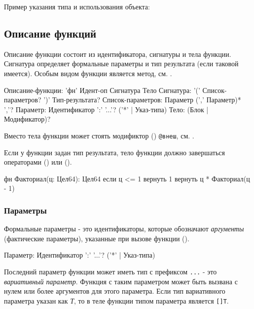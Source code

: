 \bigskip
Пример указания типа и использования объекта:


\hypertarget{functions}{%
\subsection{Описание функций}\label{decls:functions}}

Описание функции состоит из идентификатора, сигнатуры  и тела функции. 
Сигнатура определяет формальные параметры и тип результата (если таковой имеется). 
Особым видом функции является метод, см. .

\begin{Grammar}
Описание-функции: 'фн' Идент-оп Сигнатура Тело
Сигнатура: '(' Список-параметров? ')' Тип-результата?
Список-параметров: Параметр (',' Параметр)* ','?
Параметр: Идентификатор ':' '...'? ('*' | Указ-типа)  
Тело: (Блок | Модификатор)?
\end{Grammar} 

Вместо тела функции может стоять модификтор () \verb|@внеш|, см. .

Если у функции задан тип результата, тело функции должно завершаться операторами  () или  ().

\begin{Trivil}
фн Факториал(ц: Цел64): Цел64 {
    если ц <= 1 { вернуть 1 }
    вернуть ц * Факториал(ц - 1)
}
\end{Trivil}

\hypertarget{params}{%
\subsubsection{Параметры}\label{decls:params}}

Формальные параметры - это идентификаторы, которые обозначают \emph{аргументы} (фактические параметры), указанные при вызове функции ().

\begin{Grammar}
Параметр: Идентификатор ':' '...'? ('*' | Указ-типа)  
\end{Grammar} 

Последний параметр функции может иметь тип с префиксом \verb|...| - это \emph{вариативный параметр}. Функция с таким параметром может быть вызвана с нулем или более аргументов для этого параметра. Если тип вариативного параметра указан как \emph{Т}, то в теле функции типом  параметра является \verb+[]T+.

